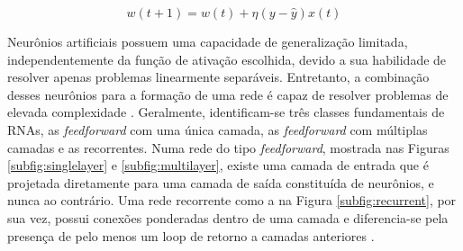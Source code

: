 \begin{equation}
  \label{eq:aprendizado}
  w(t+1) = w(t) + \eta (y - \hat{y}) x(t)
\end{equation}

Neurônios artificiais possuem uma capacidade de generalização limitada, independentemente da função de ativação escolhida, devido a sua habilidade de resolver apenas problemas linearmente separáveis. Entretanto, a combinação desses neurônios para a formação de uma rede é capaz de resolver problemas de elevada complexidade \cite{braga}. Geralmente, identificam-se três classes fundamentais de RNAs, as \emph{feedforward} com uma única camada, as \emph{feedforward} com múltiplas camadas e as recorrentes. Numa rede do tipo \emph{feedforward}, mostrada nas Figuras \ref{subfig:singlelayer} e \ref{subfig:multilayer}, existe uma camada de entrada que é projetada diretamente para uma camada de saída constituída de neurônios, e nunca ao contrário. Uma rede recorrente como a na Figura \ref{subfig:recurrent}, por sua vez, possui conexões ponderadas dentro de uma camada e diferencia-se pela presença de pelo menos um loop de retorno a camadas anteriores \cite{haykin}.


